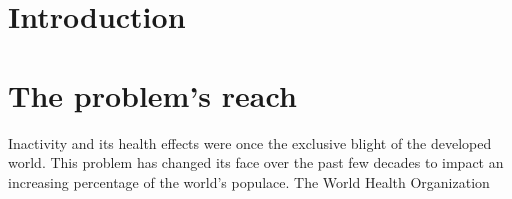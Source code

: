 \documentclass[12pt,article]{IEEEtran}
\begin{document}
	
		 
	\section{Introduction}

	\section{The problem's reach}
		 Inactivity and its health effects were once the exclusive blight of 
		the developed world. This problem has changed its face over the past few decades to impact an 
		increasing percentage of the world's populace. The World Health Organization  
		\cite{18} 
\end{document}
